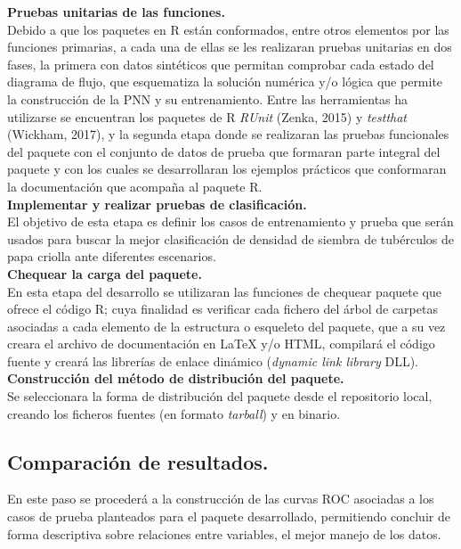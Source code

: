 \noindent
\textbf{Pruebas unitarias de las funciones.}\\

Debido a que los paquetes en R están conformados, entre otros elementos por las funciones primarias, a cada una de ellas se les realizaran pruebas unitarias en dos fases, la primera con datos sintéticos que permitan comprobar cada estado del diagrama de flujo, que esquematiza la solución numérica y/o lógica que permite la construcción de la PNN y su entrenamiento. Entre las herramientas ha utilizarse se encuentran los paquetes de R \emph{RUnit} (Zenka, 2015) y \emph{testthat} (Wickham, 2017), y la segunda etapa donde se realizaran las pruebas funcionales del paquete con el conjunto de datos de prueba que formaran parte integral del paquete y con los cuales se desarrollaran los ejemplos prácticos que conformaran la documentación que acompaña al paquete R.\\

\noindent
\textbf{Implementar y realizar pruebas de clasificación.}\\

El objetivo de esta etapa es definir los casos de entrenamiento y prueba que serán usados para buscar la mejor clasificación de densidad de siembra de tubérculos de papa criolla  ante diferentes escenarios.\\

 
  
\noindent
\textbf{Chequear la carga del paquete.}\\

En esta etapa del desarrollo se utilizaran las funciones de chequear paquete que ofrece el código R; cuya finalidad es verificar cada fichero del árbol de carpetas asociadas a cada elemento de la estructura o esqueleto del paquete, que a su vez creara el archivo de documentación en LaTeX y/o HTML, compilará el código fuente y creará las librerías de enlace dinámico (\emph{dynamic link library} DLL).\\  

\noindent
\textbf{Construcci\'on del m\'etodo de distribuci\'on del paquete.}\\

Se seleccionara la forma de distribución del paquete desde el repositorio local, creando los ficheros fuentes  (en formato  \emph{tarball})  y en binario.\\


\subsection{Comparación de resultados.}

En este paso se procederá a la construcción de las curvas ROC asociadas a los casos de prueba planteados para el paquete desarrollado, permitiendo concluir de forma descriptiva  sobre  relaciones entre variables, el mejor manejo de los datos.\\